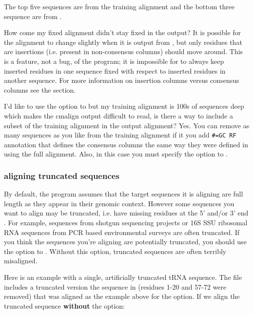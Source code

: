 The top five sequences are from the training alignment 
and the bottom three sequence are from .

\begin{srefaq}{How come my fixed alignment didn't stay fixed in the
 output?} It is possible for the  alignment
to change slightly when it is output from , but only
residues that are insertions (i.e. present in non-consensus columns)
should move around. This is a feature, not a bug, of the program; it is
impossible for  to always keep inserted residues in one sequence fixed
with respect to inserted residues in another sequence. For more
information on insertion columns versus consensus columns see the
 section.
\end{srefaq}

\begin{srefaq}{I'd like to use the  option to  
     but my training alignment is 100s of sequences deep
    which makes the cmalign output difficult to read, is there a way
    to include a subset of the training alignment in the output
    alignment?} Yes.  You can remove as many sequences as you like
    from the training alignment if it you add {\small\verb+#=GC RF+}
    annotation that defines the consensus columns the same way they
    were defined in  using the full alignment. Also, in
    this case you must specify the  option to
    .
  \end{srefaq}

\subsubsection{aligning truncated sequences}
By default, the  program assumes that the target
sequences it is aligning are full length as they appear in their genomic
context. However some sequences you want to align may be truncated,
i.e.  have missing residues at the 5' and/or 3' end . For example,
sequences from shotgun sequencing projects or 16S SSU ribosomal RNA
sequences from PCR based environmental surveys are often truncated. If
you think the sequences you're aligning are potentially truncated, you
should use the  option to . Without this
option, truncated sequences are often terribly misaligned.

Here is an example with a single, artificially truncated tRNA
sequence. The file  includes a truncated
version the sequence in  (residues 1-20 and 57-72
were removed) that was aligned as the example above for 
the  option. If we align the truncated sequence
\textbf{without} the  option: 

